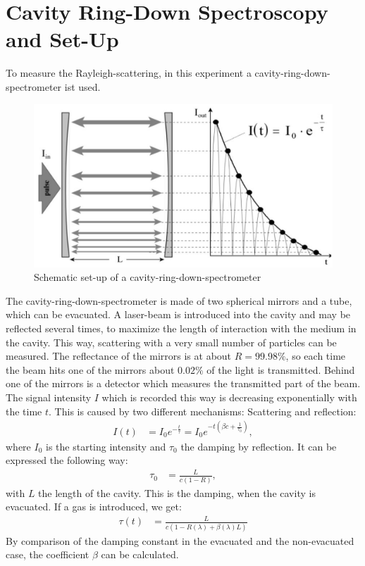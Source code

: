 \documentclass[
	parskip=half,10pt,
	numbers= noenddot, %
	toc=flat, %
	oneside,
	twocolumn,
	]{scrartcl}
\begin{document}
\section{Cavity Ring-Down Spectroscopy and Set-Up}

To measure the Rayleigh-scattering, in this experiment a cavity-ring-down-spectrometer ist used. 
\begin{figure}[h]
\includegraphics[width=.48 \textwidth]{images/crds.pdf}
\caption{Schematic set-up of a cavity-ring-down-spectrometer \cite{wiki}}
\label{fig:set-up}
\end{figure}
The cavity-ring-down-spectrometer is made of two spherical mirrors and a tube, which can be evacuated. A laser-beam is introduced into the cavity and may be reflected 
several times, to maximize the length of interaction with the medium in the cavity. This way, scattering with a very small number of particles can be measured. 
The reflectance of the mirrors is at about $R=99.98 \%$, so each time the beam hits one of the mirrors about $0.02\%$ of the light is 
transmitted. Behind one of the mirrors is a detector which measures the transmitted part of the beam. The signal intensity $I$ which is recorded this way is 
decreasing exponentially with the time $t$. This is caused by two different mechanisms: Scattering and reflection:
\begin{align}
I(t) &= I_0 e^{-\frac{t}{\tau}}=I_0 e^{- t \left ( \beta c + \frac{1}{\tau_0} \right )},
\label{eq:IDec}
\end{align}
where $I_0$ is the starting intensity and $\tau_0$ the damping by reflection. It can be expressed the following way:
\begin{align}
\tau_0 &= \frac{L}{c(1-R)},
\end{align}
with $L$ the length of the cavity. This is the damping, when the cavity is evacuated. If a gas is introduced, we get:
\begin{align}
\tau(t) &= \frac{L}{c(1-R(\lambda) + \beta(\lambda)L)}
\end{align}
By comparison of the damping constant in the evacuated and the non-evacuated case, the coefficient $\beta$ can be calculated. 
\end{document}
